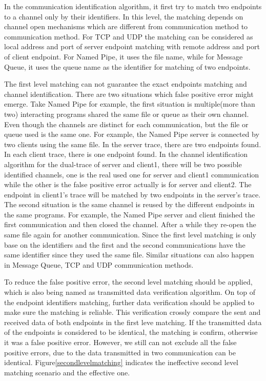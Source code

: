 In the communication identification algorithm, it first try to match two endpoints to a channel only by their identifiers. In this level, the matching depends on channel open mechanisms which are different from communication method to communication method. For TCP and UDP the matching can be considered as local address and port of server endpoint matching with remote address and port of client endpoint. For Named Pipe, it uses the file name, while for Message Queue, it uses the queue name as the identifier for matching of two endpoints. 

The first level matching can not guarantee the exact endpoints matching and channel identification. There are two situations which false positive error might emerge. Take Named Pipe for example, the first situation is multiple(more than two) interacting programs shared the same file or queue as their own channel. Even though the channels are distinct for each communication, but the file or queue used is the same one. For example, the Named Pipe server is connected by two clients using the same file. In the server trace, there are two endpoints found. In each client trace, there is one endpoint found. In the channel identification algorithm for the dual-trace of server and client1, there will be two possible identified channels, one is the real used one for server and client1 communication while the other is the false positive error actually is for server and client2. The endpoint in client1's trace will be matched by two endpoints in the server's trace. The second situation is the same channel is reused by the different endpoints in the same programs. For example, the Named Pipe server and client finished the first communication and then closed the channel. After a while they re-open the same file again for another communication. Since the first level matching is only base on the identifiers and the first and the second communications have the same identifier since they used the same file. Similar situations can also happen in Message Queue, TCP and UDP communication methods. 

To reduce the false positive error, the second level matching should be applied, which is also being named as transmitted data verification algorithm. On top of the endpoint identifiers matching, further data verification should be applied to make sure the matching is reliable. This verification crossly compare the sent and received data of both endpoints in the first leve matching. If the transmitted data of the endpoints is considered to be identical, the matching is confirm, otherwise it was a false positive error. However, we still can not exclude all the false positive errors, due to the data transmitted in two communication can be identical. Figure\ref{secondlevelmatching} indicates the ineffective second level matching scenario and the effective one.

